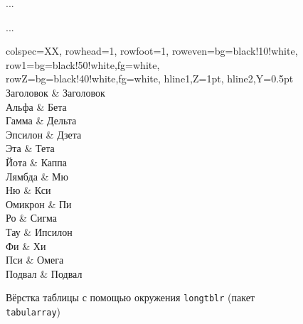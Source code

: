 \documentclass[a4paper,12pt,hyphens]{article}
\newcommand\package[1]{\texttt{#1}}
\begin{document}
\begin{figure}[tp]
\begin{latexcode}
...
\usepackage{tabularray}
%
%
...
\begin{longtblr}[
  label={table1},
  caption={Пример},
  remark{Примечание}={Таблица разорвана на две колонки.}
]{
  colspec={XX},
  rowhead=1,
  rowfoot=1,
  row{even}={bg=black!10!white},
  row{1}={bg=black!50!white,fg=white},
  row{Z}={bg=black!40!white,fg=white},
  hline{1,Z}={1pt},
  hline{2,Y}={0.5pt}
}
Заголовок & Заголовок \\
Альфа     & Бета      \\
Гамма     & Дельта    \\
Эпсилон   & Дзета     \\
Эта       & Тета      \\
Йота      & Каппа     \\
Лямбда    & Мю        \\
Ню        & Кси       \\
Омикрон   & Пи        \\
Ро        & Сигма     \\
Тау       & Ипсилон   \\
Фи        & Хи        \\
Пси       & Омега     \\
Подвал    & Подвал    \\
\end{longtblr}
\end{latexcode}
\caption{Вёрстка таблицы с помощью окружения \package{longtblr} (пакет \package{tabularray})}\label{tabularray3}
\end{figure}%
\end{document}
